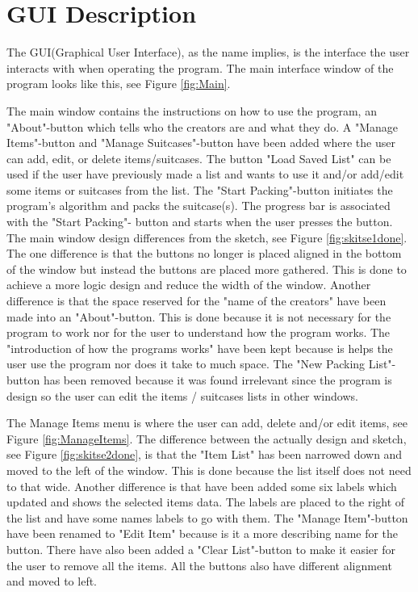 \section{GUI Description}
\label{sec:GUI}
The GUI(Graphical User Interface), as the name implies, is the interface the user interacts with when operating the program.
The main interface window of the program looks like this, see Figure \ref{fig:Main}.


The main window contains the instructions on how to use the program, an "About"-button which tells who the creators are and what they do. A "Manage Items"-button and "Manage Suitcases"-button have been added where the user can add, edit, or delete items/suitcases. The button "Load Saved List" can be used if the user have previously made a list and wants to use it and/or add/edit some items or suitcases from the list. The "Start Packing"-button initiates the program's algorithm and packs the suitcase(s). The progress bar is associated with the "Start Packing"- button and starts when the user presses the button.
The main window design differences from the sketch, see Figure \ref{fig:skitse1done}. The one difference is that the buttons no longer is placed aligned in the bottom of the window but instead the buttons are placed more gathered. This is done to achieve a more logic design and reduce the width of the window. Another difference is that the space reserved for the "name of the creators" have been made into an "About"-button. This is done because it is not necessary for the program to work nor for the user to understand how the program works. The "introduction of how the programs works" have been kept because is helps the user use the program nor does it take to much space.
The "New Packing List"-button has been removed because it was found irrelevant since the program is design so the user can edit the items / suitcases lists in other windows.

The Manage Items menu is where the user can add, delete and/or edit items, see Figure \ref{fig:ManageItems}. The difference between the actually design and sketch, see Figure \ref{fig:skitse2done}, is that the "Item List" has been narrowed down and moved to the left of the window. This is done because the list itself does not need to that wide. Another difference is that have been added some six labels which updated and shows the selected items data. The labels are placed to the right of the list and have some names labels to go with them. The "Manage Item"-button have been renamed to "Edit Item" because is it a more describing name for the button. There have also been added a "Clear List"-button to make it easier for the user to remove all the items. All the buttons also have different alignment and moved to left.

